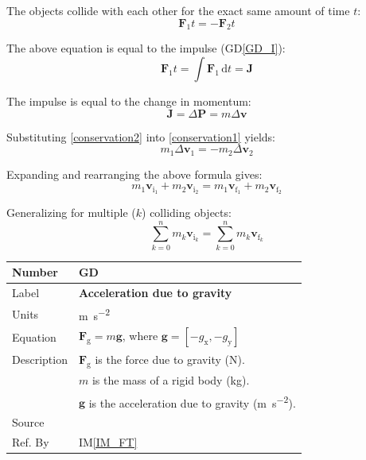 \documentclass[12pt]{article}
\newcommand{\colAwidth}{0.13\textwidth}
\newcommand{\colBwidth}{0.82\textwidth}
\newcounter{defnum} %
\newcommand{\dt}{\mathrm{d}t}
\begin{document}
\noindent
The objects collide with each other for the exact same amount of time $t$:
\begin{equation}
\mathbf{F}_1t = - \mathbf{F}_2t \label{conservation1}
\end{equation}

\noindent
The above equation is equal to the impulse (GD\ref{GD_I}):
\begin{equation*}
\mathbf{F}_1t = \int \mathbf{F}_1 \, \dt = \mathbf{J}
\end{equation*}

\noindent
The impulse is equal to the change in momentum: 
\begin{equation}
\mathbf{J}= \Delta\mathbf{P} = m\Delta\mathbf{v} \label{conservation2}
\end{equation}

\noindent
Substituting \ref{conservation2} into \ref{conservation1} yields:
\begin{equation*}
m_1\Delta\mathbf{v}_1 = -m_2\Delta\mathbf{v}_2
\end{equation*}

\noindent
Expanding and rearranging the above formula gives:
\begin{equation*}
m_1\mathbf{v}_{\text{i}_1} + m_2\mathbf{v}_{\text{i}_2} = m_1\mathbf{v}_{\text{f}_1} + m_2\mathbf{v}_{\text{f}_2}
\end{equation*}

\noindent
Generalizing for multiple ($k$) colliding objects: 
\begin{equation*}
\sum_{k=0}^{n} m_k\mathbf{v}_{\text{i}_k} = \sum_{k=0}^{n} m_k\mathbf{v}_{\text{f}_k}
\end{equation*}


\noindent
\begin{minipage}{\textwidth}
\renewcommand*{\arraystretch}{1.5}
\begin{tabular}{| p{\colAwidth} | p{\colBwidth} |}
	\hline
	\rowcolor[gray]{0.9}
	Number & GD{defnum}\thedefnum \label{GD_GA}\\
	\hline
	Label & \textbf{Acceleration due to gravity} \\
	\hline
	Units & \si{\metre\per\second\tothe{2}} \\
	\hline
	Equation & $\mathbf{F}_\mathrm{g} = m\mathbf{g}$, where $\mathbf{g} = [-g_\mathrm{x}, -g_\mathrm{y}]$ \\
	\hline
	Description & 
	$\mathbf{F}_\mathrm{g}$ is the force due to gravity (\si{\newton}). \\
	& $m$ is the mass of a rigid body (\si{\kilogram}). \\
	& $\mathbf{g}$ is the acceleration due to gravity (\si{\metre\per\second\tothe{2}}). \\
	\hline
	Source & \\
	\hline
	Ref. By & IM\ref{IM_FT} \\
	\hline
\end{tabular}	
\end{minipage}
\end{document}
